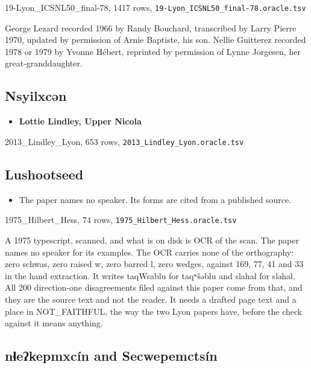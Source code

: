 19-Lyon\_ICSNL50\_final-78, 1417 rows, \texttt{19-\allowbreak{}Lyon\_\allowbreak{}ICSNL50\_\allowbreak{}final-\allowbreak{}78.\allowbreak{}oracle.\allowbreak{}tsv}

George Lezard recorded 1966 by Randy Bouchard, transcribed by Larry Pierre 1970, updated by permission of Arnie Baptiste, his son. Nellie Guitterez recorded 1978 or 1979 by Yvonne Hébert, reprinted by permission of Lynne Jorgesen, her great-granddaughter.

\subsection{Nsyilxcən}

\begin{itemize}
\item \textbf{Lottie Lindley, Upper Nicola}
\end{itemize}

2013\_Lindley\_Lyon, 653 rows, \texttt{2013\_\allowbreak{}Lindley\_\allowbreak{}Lyon.\allowbreak{}oracle.\allowbreak{}tsv}

\subsection{Lushootseed}

\begin{itemize}
\item The paper names no speaker. Its forms are cited from a published source.
\end{itemize}

1975\_Hilbert\_Hess, 74 rows, \texttt{1975\_\allowbreak{}Hilbert\_\allowbreak{}Hess.\allowbreak{}oracle.\allowbreak{}tsv}

A 1975 typescript, scanned, and what is on disk is OCR of the scan. The paper names no speaker for its examples. The OCR carries none of the orthography: zero schwas, zero raised w, zero barred l, zero wedges, against 169, 77, 41 and 33 in the hand extraction. It writes taqWsablu for taqʷšəblu and slahal for sləhal. All 200 direction-one disagreements filed against this paper come from that, and they are the source text and not the reader. It needs a drafted page text and a place in NOT\_FAITHFUL, the way the two Lyon papers have, before the check against it means anything.

\subsection{nɬeʔkepmxcín and Secwepemctsín}

